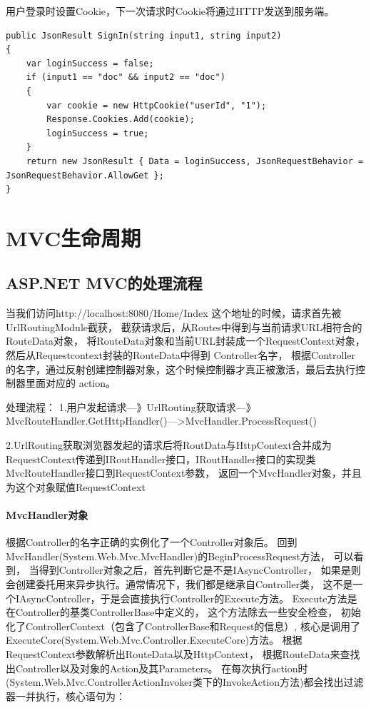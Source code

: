 \documentclass{book}
\begin{document}
用户登录时设置Cookie，下一次请求时Cookie将通过HTTP发送到服务端。

\begin{lstlisting}[language={[Sharp]C}]
public JsonResult SignIn(string input1, string input2)
{
    var loginSuccess = false;
    if (input1 == "doc" && input2 == "doc")
    {
        var cookie = new HttpCookie("userId", "1");
        Response.Cookies.Add(cookie);
        loginSuccess = true;
    }
    return new JsonResult { Data = loginSuccess, JsonRequestBehavior = JsonRequestBehavior.AllowGet };
}
\end{lstlisting}

\section{MVC生命周期}

\subsection{ASP.NET MVC的处理流程}

当我们访问http://localhost:8080/Home/Index 这个地址的时候，请求首先被UrlRoutingModule截获，
截获请求后，从Routes中得到与当前请求URL相符合的RouteData对象， 
将RouteData对象和当前URL封装成一个RequestContext对象，然后从Requestcontext封装的RouteData中得到 Controller名字，
根据Controller的名字，通过反射创建控制器对象，这个时候控制器才真正被激活，最后去执行控制器里面对应的 action。

处理流程：
1.用户发起请求---》UrlRouting获取请求—》MvcRouteHandler.GetHttpHandler()—>MvcHandler.ProcessRequest()

2.UrlRouting获取浏览器发起的请求后将RoutData与HttpContext合并成为RequestContext传递到IRoutHandler接口，IRoutHandler接口的实现类MvcRouteHandler接口到RequestContext参数，
返回一个MvcHandler对象，并且为这个对象赋值RequestContext

\paragraph{MvcHandler对象}
根据Controller的名字正确的实例化了一个Controller对象后。
回到MvcHandler(System.Web.Mvc.MvcHandler)的BeginProcessRequest方法，
可以看到，
当得到Controller对象之后，首先判断它是不是IAsyncController，
如果是则会创建委托用来异步执行。通常情况下，我们都是继承自Controller类，
这不是一个IAsyncController，于是会直接执行Controller的Execute方法。
Execute方法是在Controller的基类ControllerBase中定义的，
这个方法除去一些安全检查，
初始化了ControllerContext（包含了ControllerBase和Request的信息）,
核心是调用了ExecuteCore(System.Web.Mvc.Controller.ExecuteCore)方法。
根据RequestContext参数解析出RouteData以及HttpContext，
根据RouteData来查找出Controller以及对象的Action及其Parameters。
在每次执行action时(System.Web.Mvc.ControllerActionInvoker类下的InvokeAction方法)都会找出过滤器一并执行，核心语句为：
\end{document}
